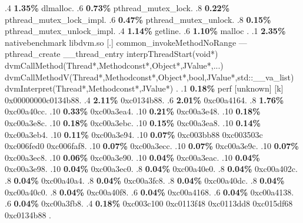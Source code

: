 \begin{profile}
{.4 \textbf{1.35\%} dlmalloc. 
.6 \textbf{0.73\%} pthread\_mutex\_lock. 
.8 \textbf{0.22\%} pthread\_mutex\_lock\_impl. 
.6 \textbf{0.47\%} pthread\_mutex\_unlock. 
.8 \textbf{0.15\%} pthread\_mutex\_unlock\_impl. 
.4 \textbf{1.14\%} getline. 
.6 \textbf{1.10\%} malloc\newline {} . 
.1 \textbf{ 2.35\%} nativebenchmark  libdvm.so              [.] common\_invokeMethodNoRange\newline {} ---pthread\_create\newline {} \_\_thread\_entry\newline {} interpThreadStart(void*)\newline {} dvmCallMethod(Thread*,Methodconst*,Object*,JValue*,...)\newline {} dvmCallMethodV(Thread*,Methodconst*,Object*,bool,JValue*,std::\_\_va\_list)\newline {} dvmInterpret(Thread*,Methodconst*,JValue*)\newline {} . 
.1 \textbf{ 0.18\%} perf             [unknown]              [k] 0x00000000c0134b88. 
.4 \textbf{2.11\%} 0xc0134b88. 
.6 \textbf{2.01\%} 0xc00a4164. 
.8 \textbf{1.76\%} 0xc00a40cc. 
.10 \textbf{0.33\%} 0xc00a3ea4. 
.10 \textbf{0.21\%} 0xc00a3e48. 
.10 \textbf{0.18\%} 0xc00a3e8c. 
.10 \textbf{0.18\%} 0xc00a3ebc. 
.10 \textbf{0.15\%} 0xc00a3ea8. 
.10 \textbf{0.14\%} 0xc00a3eb4. 
.10 \textbf{0.11\%} 0xc00a3e94. 
.10 \textbf{0.07\%} 0xc003bb88\newline {} 0xc003503c\newline {} 0xc006fed0\newline {} 0xc006faf8. 
.10 \textbf{0.07\%} 0xc00a3ecc. 
.10 \textbf{0.07\%} 0xc00a3e9c. 
.10 \textbf{0.07\%} 0xc00a3ec8. 
.10 \textbf{0.06\%} 0xc00a3e90. 
.10 \textbf{0.04\%} 0xc00a3eac. 
.10 \textbf{0.04\%} 0xc00a3e98. 
.10 \textbf{0.04\%} 0xc00a3ec0. 
.8 \textbf{0.04\%} 0xc00a40e0. 
.8 \textbf{0.04\%} 0xc00a402c. 
.8 \textbf{0.04\%} 0xc00a40a4. 
.8 \textbf{0.04\%} 0xc00a3fc8. 
.8 \textbf{0.04\%} 0xc00a40dc. 
.8 \textbf{0.04\%} 0xc00a40c0. 
.8 \textbf{0.04\%} 0xc00a40f8. 
.6 \textbf{0.04\%} 0xc00a4168. 
.6 \textbf{0.04\%} 0xc00a4138. 
.6 \textbf{0.04\%} 0xc00a3fb8. 
.4 \textbf{0.18\%} 0xc003c100\newline {} 0xc0113f48\newline {} 0xc0113dd8\newline {} 0xc015df68\newline {} 0xc0134b88\newline {} . 
}
\end{profile}
